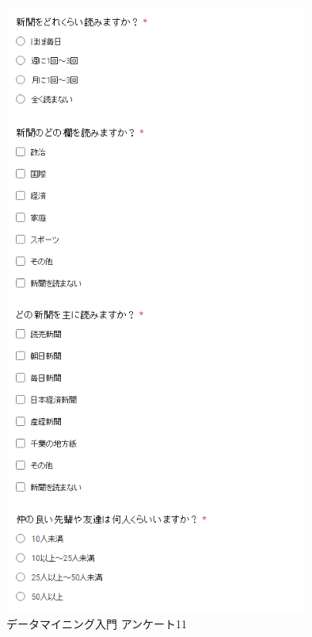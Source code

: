 \begin{figure}[p]
\centering
\includegraphics[width=10cm]{forms11.PNG}
\caption{データマイニング入門 アンケート11}\label{サンプル図}
\end{figure}

